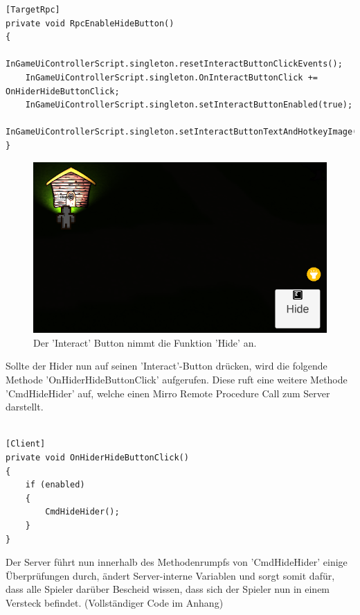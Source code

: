 \begin{lstlisting}[caption= HiderScript.cs Subscribe to InGameUiControllerScript Event]
[TargetRpc]
private void RpcEnableHideButton()
{
	InGameUiControllerScript.singleton.resetInteractButtonClickEvents();
	InGameUiControllerScript.singleton.OnInteractButtonClick += OnHiderHideButtonClick;
	InGameUiControllerScript.singleton.setInteractButtonEnabled(true);
	InGameUiControllerScript.singleton.setInteractButtonTextAndHotkeyImage('Hide');
}
\end{lstlisting}

\begin{figure}[H]
	\centering
	\includegraphics[width=120mm]{images/prototyp_hider_hide_button.png}
	\caption[Hider Hide Button]{Der 'Interact' Button nimmt die Funktion 'Hide' an.}
	\label{pic:prototyp_hider_hide_button}
\end{figure}

Sollte der Hider nun auf seinen 'Interact'-Button drücken, wird die folgende Methode 'OnHiderHideButtonClick' aufgerufen. Diese ruft eine weitere Methode 'CmdHideHider' auf, welche einen Mirro Remote Procedure Call\cite{.05.02.2022} zum Server darstellt.

\begin{lstlisting}[caption= HiderScript.csOnHiderHideButtonClick() Method]

[Client]
private void OnHiderHideButtonClick()
{
	if (enabled)
	{
		CmdHideHider();
	}
}

\end{lstlisting}

Der Server führt nun innerhalb des Methodenrumpfs von 'CmdHideHider' einige Überprüfungen durch, ändert Server-interne Variablen und sorgt somit dafür, dass alle Spieler darüber Bescheid wissen, dass sich der Spieler nun in einem Versteck befindet. (Vollständiger Code im Anhang)

